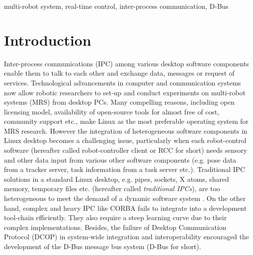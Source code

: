 \documentclass{ifacconf}
\begin{document}
\begin{frontmatter}
\begin{keyword}
multi-robot system, real-time control, inter-process communication, D-Bus
\end{keyword}

\end{frontmatter}
\section{Introduction}
Inter-process communications (IPC) among various desktop software components enable them to talk to each other and exchange data, messages or request of services. Technological advancements in computer and communication systems  now allow robotic researchers to set-up and conduct experiments on multi-robot systems (MRS) from  desktop PCs. Many compelling reasons, including open licensing model, availability of open-source tools for almost free of cost, community support etc., make Linux as the most preferable operating system for MRS research. However the integration of heterogeneous software components in Linux desktop becomes a challenging issue, particularly when each robot-control software (hereafter called robot-controller client or RCC for short) needs sensory and other data input from various other software components (e.g. pose data from a tracker server, task information from a task server etc.).  
Traditional IPC solutions in a standard Linux desktop, e.g. pipes, sockets, X atoms, shared memory, temporary files etc. (hereafter called {\em traditional IPCs}),  are too heterogeneous to meet the demand of a dynamic software system \cite{Wittenburg2005}. On the other hand, complex and heavy IPC like CORBA fails to integrate into a development tool-chain efficiently. They also require a steep learning curve due to their complex implementations. Besides, the failure of Desktop Communication Protocol (DCOP) in system-wide integration and interoperability encouraged the development  of the D-Bus message bus system (D-Bus for short).\\
\end{document}
